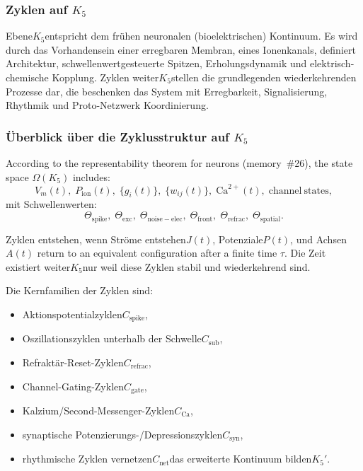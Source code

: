 
\subsubsection{Zyklen auf \texorpdfstring{$K_5$}{K_5}}
\label{sec:cycles-k5}

Ebene$K_5$entspricht dem frühen neuronalen (bioelektrischen) Kontinuum.
Es wird durch das Vorhandensein einer erregbaren Membran, eines Ionenkanals, definiert
Architektur, schwellenwertgesteuerte Spitzen, Erholungsdynamik und
elektrisch-chemische Kopplung.
Zyklen weiter$K_5$stellen die grundlegenden wiederkehrenden Prozesse dar, die beschenken
das System mit Erregbarkeit, Signalisierung, Rhythmik und Proto-Netzwerk
Koordinierung.

\subsubsection{Überblick über die Zyklusstruktur auf \texorpdfstring{$K_5$}{K_5}}

According to the representability theorem for neurons (memory~\#26),
the state space $\Omega(K_5)$ includes:
\[
  V_m(t),\;
  P_{\mathrm{ion}}(t),\;
  \{g_i(t)\},\;
  \{w_{ij}(t)\},\;
  \mathrm{Ca}^{2+}(t),\;
  \mathrm{channel\ states},
\]
mit Schwellenwerten:
\[
  \Theta_{\mathrm{spike}},\;
  \Theta_{\mathrm{exc}},\;
  \Theta_{\mathrm{noise-elec}},\;
  \Theta_{\mathrm{front}},\;
  \Theta_{\mathrm{refrac}},\;
  \Theta_{\mathrm{spatial}}.
\]

Zyklen entstehen, wenn Ströme entstehen$J(t)$, Potenziale$P(t)$, und Achsen$A(t)$
return to an equivalent configuration after a finite time $\tau$.
Die Zeit existiert weiter$K_5$nur weil diese Zyklen stabil und wiederkehrend sind.

Die Kernfamilien der Zyklen sind:

\begin{itemize}
  \item Aktionspotentialzyklen$C_{\mathrm{spike}}$,
  \item Oszillationszyklen unterhalb der Schwelle$C_{\mathrm{sub}}$,
  \item Refraktär-Reset-Zyklen$C_{\mathrm{refrac}}$,
  \item Channel-Gating-Zyklen$C_{\mathrm{gate}}$,
  \item Kalzium/Second-Messenger-Zyklen$C_{\mathrm{Ca}}$,
  \item synaptische Potenzierungs-/Depressionszyklen$C_{\mathrm{syn}}$,
  \item rhythmische Zyklen vernetzen$C_{\mathrm{net}}$das erweiterte Kontinuum bilden$K_5'$.
\end{itemize}

